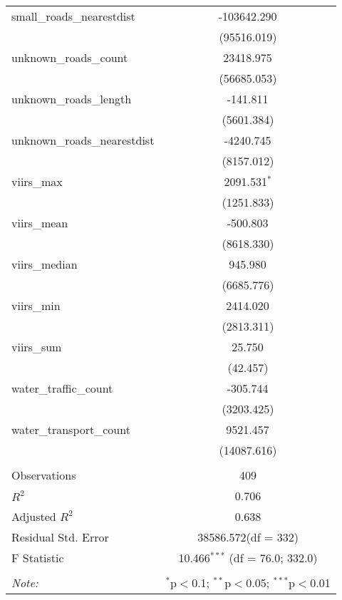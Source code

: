 \begin{table}[!htbp]
\begin{tabular}{@{\extracolsep{5pt}}lc}
 small_roads_nearestdist & -103642.290$^{}$ \\
  & (95516.019) \\
 unknown_roads_count & 23418.975$^{}$ \\
  & (56685.053) \\
 unknown_roads_length & -141.811$^{}$ \\
  & (5601.384) \\
 unknown_roads_nearestdist & -4240.745$^{}$ \\
  & (8157.012) \\
 viirs_max & 2091.531$^{*}$ \\
  & (1251.833) \\
 viirs_mean & -500.803$^{}$ \\
  & (8618.330) \\
 viirs_median & 945.980$^{}$ \\
  & (6685.776) \\
 viirs_min & 2414.020$^{}$ \\
  & (2813.311) \\
 viirs_sum & 25.750$^{}$ \\
  & (42.457) \\
 water_traffic_count & -305.744$^{}$ \\
  & (3203.425) \\
 water_transport_count & 9521.457$^{}$ \\
  & (14087.616) \\
\hline \\[-1.8ex]
 Observations & 409 \\
 $R^2$ & 0.706 \\
 Adjusted $R^2$ & 0.638 \\
 Residual Std. Error & 38586.572(df = 332)  \\
 F Statistic & 10.466$^{***}$ (df = 76.0; 332.0) \\
\hline
\hline \\[-1.8ex]
\textit{Note:} & \multicolumn{1}{r}{$^{*}$p$<$0.1; $^{**}$p$<$0.05; $^{***}$p$<$0.01} \\
\end{tabular}
\end{table}